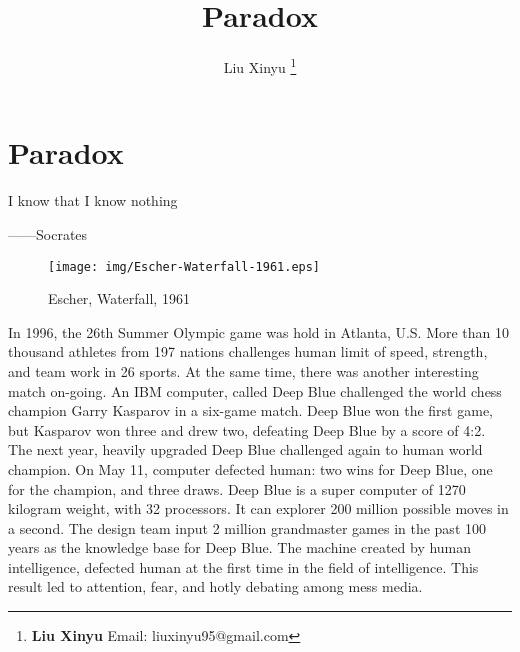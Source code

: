 \documentclass{article}
\begin{document}
\title{Paradox}

\author{Liu Xinyu
\thanks{{\bfseries Liu Xinyu} \newline
  Email: liuxinyu95@gmail.com \newline}
  }

\maketitle
\fi


\ifx\wholebook\relax
\chapter{Paradox}
\fi

\epigraph{I know that I know nothing}{——Socrates}

\begin{wrapfigure}{R}{0.5\textwidth}
 \centering
 \texttt{[image: img/Escher-Waterfall-1961.eps]}
 \captionsetup{labelformat=empty}
 \caption{Escher, Waterfall, 1961}
 \label{fig:Escher-Waterfall}
\end{wrapfigure}

In 1996, the 26th Summer Olympic game was hold in Atlanta, U.S. More than 10 thousand athletes from 197 nations challenges human limit of speed, strength, and team work in 26 sports. At the same time, there was another interesting match on-going. An IBM computer, called Deep Blue challenged the world chess champion Garry Kasparov in a six-game match. Deep Blue won the first game, but Kasparov won three and drew two, defeating Deep Blue by a score of 4:2. The next year, heavily upgraded Deep Blue challenged again to human world champion. On May 11, computer defected human: two wins for Deep Blue, one for the champion, and three draws. Deep Blue is a super computer of 1270 kilogram weight, with 32 processors. It can explorer 200 million possible moves in a second. The design team input 2 million grandmaster games in the past 100 years as the knowledge base for Deep Blue. The machine created by human intelligence, defected human at the first time in the field of intelligence. This result led to attention, fear, and hotly debating among mess media.
\end{document}
